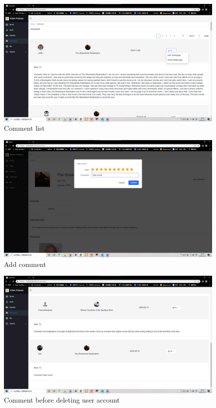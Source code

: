 \begin{CJK*}{UTF8}{gbsn}
    \begin{figure}[htbp]
    \centering
    \includegraphics[width=1\textwidth]{res_comment1.png}
    \caption{Comment list}
    \end{figure}
    
    \begin{figure}[htbp]
    \centering
    \includegraphics[width=1\textwidth]{res_comment2.png}
    \caption{Add comment}
    \end{figure}
    
    \begin{figure}[htbp]
    \centering
    \includegraphics[width=1\textwidth]{res_comment3.png}
    \caption{Comment before deleting user account}
    \end{figure}
    

\end{CJK*}
